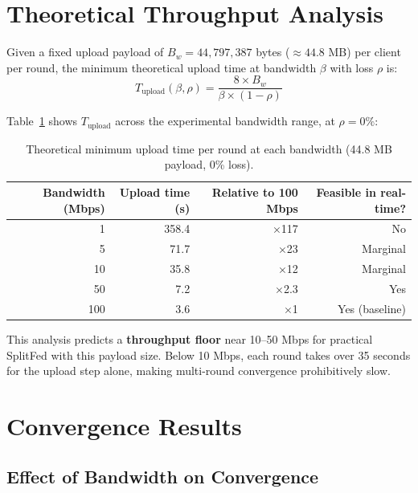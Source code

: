 \documentclass[12pt,a4paper]{report}
\begin{document}
\section{Theoretical Throughput Analysis}
\label{sec:model}

Given a fixed upload payload of $B_w = 44{,}797{,}387$ bytes ($\approx 44.8$ MB) per client per round, the minimum theoretical upload time at bandwidth $\beta$ with loss $\rho$ is:
\begin{equation}
  T_{\mathrm{upload}}(\beta, \rho) = \frac{8 \times B_w}{\beta \times (1 - \rho)}
  \label{eq:upload_time}
\end{equation}

Table~\ref{tab:theory} shows $T_{\mathrm{upload}}$ across the experimental bandwidth range, at $\rho = 0\%$:

\begin{table}[H]
\centering
\caption{Theoretical minimum upload time per round at each bandwidth (44.8 MB payload, 0\% loss).}
\label{tab:theory}
\begin{tabular}{rrrr}
\toprule
Bandwidth (Mbps) & Upload time (s) & Relative to 100 Mbps & Feasible in real-time? \\
\midrule
1   & 358.4 & $\times$117 & No \\
5   & 71.7  & $\times$23  & Marginal \\
10  & 35.8  & $\times$12  & Marginal \\
50  & 7.2   & $\times$2.3 & Yes \\
100 & 3.6   & $\times$1   & Yes (baseline) \\
\bottomrule
\end{tabular}
\end{table}

This analysis predicts a \textbf{throughput floor} near 10--50 Mbps for practical SplitFed with this payload size. Below 10 Mbps, each round takes over 35 seconds for the upload step alone, making multi-round convergence prohibitively slow.

\section{Convergence Results}
\label{sec:results}

\subsection{Effect of Bandwidth on Convergence}
\end{document}
